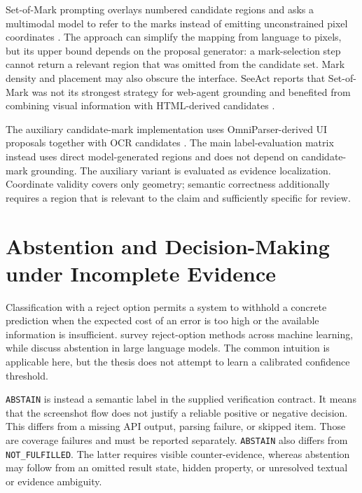 Set-of-Mark prompting overlays numbered candidate regions and asks a
multimodal model to refer to the marks instead of emitting unconstrained pixel
coordinates \autocite{yang2023}. The approach can simplify the mapping from
language to pixels, but its upper bound depends on the proposal generator: a
mark-selection step cannot return a relevant region that was omitted from the
candidate set. Mark density and placement may also obscure the interface.
SeeAct reports that Set-of-Mark was not its strongest strategy for web-agent
grounding and benefited from combining visual information with HTML-derived
candidates \autocite{zheng2024}.

The auxiliary candidate-mark implementation uses OmniParser-derived UI
proposals together with OCR candidates \autocite{lu2024omniparser}. The main
label-evaluation matrix instead uses direct model-generated regions and does
not depend on candidate-mark grounding. The auxiliary variant is evaluated as
evidence localization. Coordinate validity covers only geometry; semantic
correctness additionally requires a region that is relevant to the claim and
sufficiently specific for review.

\section{Abstention and Decision-Making under Incomplete Evidence}\label{abstention-and-decision-making-under-incomplete-evidence}

Classification with a reject option permits a system to withhold a concrete
prediction when the expected cost of an error is too high or the available
information is insufficient. \textcite{hendrickx2024} survey reject-option
methods across machine learning, while \textcite{wen2025} discuss abstention in
large language models. The common intuition is applicable here, but the thesis
does not attempt to learn a calibrated confidence threshold.

\texttt{ABSTAIN} is instead a semantic label in the supplied verification contract. It
means that the screenshot flow does not justify a reliable positive or negative
decision. This differs from a missing API output, parsing failure, or skipped
item. Those are coverage failures and must be reported separately. \texttt{ABSTAIN}
also differs from \texttt{NOT\_FULFILLED}. The latter requires visible counter-evidence,
whereas abstention may follow from an omitted result state, hidden property, or
unresolved textual or evidence ambiguity.

